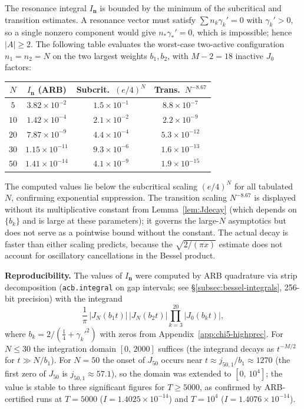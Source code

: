 \documentclass[12pt,reqno]{amsart}
\theoremstyle{plain}
\theoremstyle{definition}
\theoremstyle{remark}
\begin{document}
The resonance integral $I_{\mathbf{n}}$ is bounded by the minimum of the subcritical and transition estimates.  A resonance vector must satisfy $\sum n_k \gamma_k' = 0$ with $\gamma_k' > 0$, so a single nonzero component would give $n_*\gamma_*' = 0$, which is impossible; hence $|A| \geq 2$.  The following table evaluates the worst-case two-active configuration $n_1 = n_2 = N$ on the two largest weights $b_1, b_2$, with $M - 2 = 18$ inactive $J_0$ factors:
\begin{center}
\renewcommand{\arraystretch}{1.1}
\begin{tabular}{cccc}
\toprule
$N$ & $I_{\mathbf{n}}$ (ARB) & Subcrit.\ $(e/4)^N$ & Trans.\ $N^{-8.67}$ \\
\midrule
$5$  & $3.82 \times 10^{-2}$  & $1.5 \times 10^{-1}$ & $8.8 \times 10^{-7}$ \\
$10$ & $1.42 \times 10^{-4}$  & $2.1 \times 10^{-2}$ & $2.2 \times 10^{-9}$ \\
$20$ & $7.87 \times 10^{-9}$  & $4.4 \times 10^{-4}$ & $5.3 \times 10^{-12}$ \\
$30$ & $1.15 \times 10^{-11}$ & $9.3 \times 10^{-6}$ & $1.6 \times 10^{-13}$ \\
$50$ & $1.41 \times 10^{-14}$ & $4.1 \times 10^{-9}$ & $1.9 \times 10^{-15}$ \\
\bottomrule
\end{tabular}
\end{center}

The computed values lie below the subcritical scaling $(e/4)^N$ for all tabulated $N$, confirming exponential suppression.  The transition scaling $N^{-8.67}$ is displayed without its multiplicative constant from Lemma~\ref{lem:Jdecay} (which depends on $\{b_k\}$ and is large at these parameters); it governs the large-$N$ asymptotics but does not serve as a pointwise bound without the constant.  The actual decay is faster than either scaling predicts, because the $\sqrt{2/(\pi x)}$ estimate does not account for oscillatory cancellations in the Bessel product.

\medskip\noindent\textbf{Reproducibility.}  The values of $I_{\mathbf{n}}$ were computed by ARB quadrature via strip decomposition (\texttt{acb.integral} on gap intervals; see \S\ref{subsec:bessel-integrals}, 256-bit precision) with the integrand
\[
  \frac{1}{\pi}\,|J_N(b_1 t)|\,|J_N(b_2 t)|\prod_{k=3}^{20}|J_0(b_k t)|,
\]
where $b_k = 2/(\tfrac{1}{4} + {\gamma_k'}^2)$ with zeros from Appendix~\ref{app:chi5-highprec}.  For $N \leq 30$ the integration domain $[0,\, 2000]$ suffices (the integrand decays as $t^{-M/2}$ for $t \gg N/b_1$).  For $N = 50$ the onset of $J_{50}$ occurs near $t \approx j_{50,1}/b_1 \approx 1270$ (the first zero of $J_{50}$ is $j_{50,1} \approx 57.1$), so the domain was extended to $[0,\, 10^4]$; the value is stable to three significant figures for $T \geq 5000$, as confirmed by ARB-certified runs at $T = 5000$ ($I = 1.4025 \times 10^{-14}$) and $T = 10^4$ ($I = 1.4076 \times 10^{-14}$).
\end{document}
